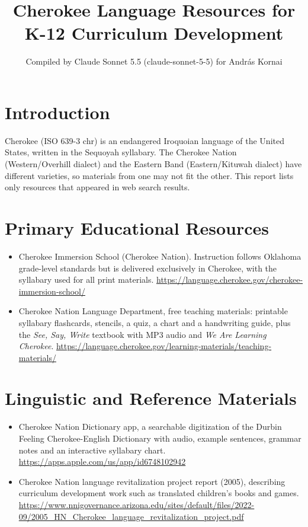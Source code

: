 \documentclass[12pt]{article}
\title{Cherokee Language Resources for K-12 Curriculum Development}
\author{Compiled by Claude Sonnet 5.5 (claude-sonnet-5-5) for Andr\'as Kornai}
\date{}
\begin{document}
\maketitle

\section{Introduction}
Cherokee (ISO 639-3 chr) is an endangered Iroquoian language of the United States, written in the Sequoyah syllabary. The Cherokee Nation (Western/Overhill dialect) and the Eastern Band (Eastern/Kituwah dialect) have different varieties, so materials from one may not fit the other. This report lists only resources that appeared in web search results.

\section{Primary Educational Resources}
\begin{itemize}
\item Cherokee Immersion School (Cherokee Nation). Instruction follows Oklahoma grade-level standards but is delivered exclusively in Cherokee, with the syllabary used for all print materials. \url{https://language.cherokee.gov/cherokee-immersion-school/}
\item Cherokee Nation Language Department, free teaching materials: printable syllabary flashcards, stencils, a quiz, a chart and a handwriting guide, plus the \emph{See, Say, Write} textbook with MP3 audio and \emph{We Are Learning Cherokee}. \url{https://language.cherokee.gov/learning-materials/teaching-materials/}
\end{itemize}

\section{Linguistic and Reference Materials}
\begin{itemize}
\item Cherokee Nation Dictionary app, a searchable digitization of the Durbin Feeling Cherokee-English Dictionary with audio, example sentences, grammar notes and an interactive syllabary chart. \url{https://apps.apple.com/us/app/id6748102942}
\item Cherokee Nation language revitalization project report (2005), describing curriculum development work such as translated children's books and games. \url{https://www.nnigovernance.arizona.edu/sites/default/files/2022-09/2005_HN_Cherokee_language_revitalization_project.pdf}
\end{itemize}
\end{document}

